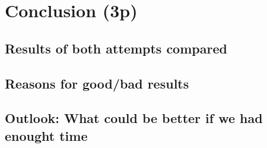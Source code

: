 \documentclass[../Main.tex]{subfiles}
\begin{document}
\section{Conclusion (3p)}
\subsection{Results of both attempts compared}
\subsection{Reasons for good/bad results}
\subsection{Outlook: What could be better if we had enought time}
\end{document}
